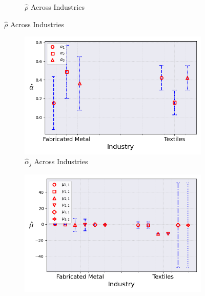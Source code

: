 \documentclass{article}
\begin{document}
\begin{figure}[ht!]
\begin{subfigure}[t]{0.32\textwidth}
        \caption{$\hat\rho$ Across Industries}
    \end{subfigure}
\end{figure}

\begin{figure}[ht!]
    \centering 
    \caption{AR(1) Mixture Model with $\log K$, Import and CIIU Across Industries ($\hat{M}_0 = 3$)}
    \begin{subfigure}[t]{0.32\textwidth}
        \centering
        \includegraphics[width=\textwidth]{figure/ar1_mixture_kmshare_ciiu_alpha_across_industries_m3.png}
        \caption{$\hat\alpha_j$ Across Industries}
    \end{subfigure}
    \begin{subfigure}[t]{0.32\textwidth}
        \centering
        \includegraphics[width=\textwidth]{figure/ar1_mixture_kmshare_ciiu_mu_across_industries_m3.png}

\end{subfigure}
\end{figure}
\end{document}
